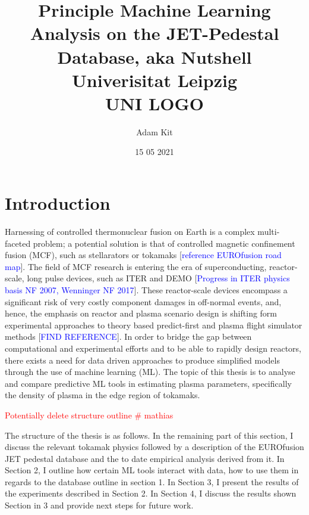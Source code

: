 \documentclass[a4paper, twoside, final, 12pt]{article}
\title{
	{Principle Machine Learning Analysis on the JET-Pedestal Database, aka Nutshell} \\ 
	{\large Univerisitat Leipzig} \\
	{ UNI LOGO } \\ 
	}
\author{Adam Kit}
\date{15 05 2021}
\begin{document}
    \maketitle
    \newpage
    \tableofcontents
    \newpage
\section{Introduction}\label{sec:introduction}
Harnessing of controlled thermonuclear fusion on Earth is a complex multi-faceted problem; a potential solution is that of controlled magnetic confinement fusion (MCF), such as stellarators or tokamaks [\textcolor{blue}{reference EUROfusion road map}].
The field of MCF research is entering the era of superconducting, reactor-scale, long pulse devices, such as ITER and DEMO [\textcolor{blue}{Progress in ITER physics basis NF 2007, Wenninger NF 2017}].
These reactor-scale devices encompass a significant risk of very costly component damages in off-normal events, and, hence, the emphasis on reactor and plasma scenario design is shifting form experimental approaches to theory based predict-first and plasma flight simulator methods [\textcolor{blue}{FIND REFERENCE}].
In order to bridge the gap between computational and experimental efforts and to be able to rapidly design reactors, there exists a need for data driven approaches to produce simplified models through the use of machine learning (ML).
The topic of this thesis is to analyse and compare predictive ML tools in estimating plasma parameters, specifically the density of plasma in the edge region of tokamaks.

\textcolor{red}{Potentially delete structure outline \# mathias}

The structure of the thesis is as follows.
In the remaining part of this section, I discuss the relevant tokamak physics followed by a description of the EUROfusion JET pedestal database and the to date empirical analysis derived from it.
In Section 2, I outline how certain ML tools interact with data, how to use them in regards to the database outline in section 1.
In Section 3, I present the results of the experiments described in Section 2. 
In Section 4, I discuss the results shown Section in 3 and provide next steps for future work.
\end{document}
